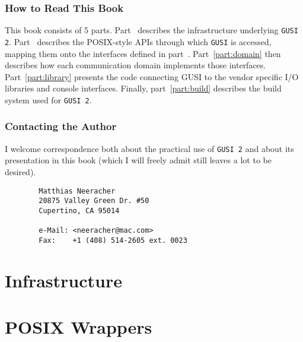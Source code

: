 \documentclass[a4paper,dvips]{book}
\newcommand{\clearemptydoublepage}{\newpage{\pagestyle{empty}\cleardoublepage}}
\begin{document}
\section{How to Read This Book}

This book consists of 5 parts. Part~\ref{part:infra} describes the infrastructure underlying \texttt{GUSI 2}.
Part~\ref{part:POSIX} describes the POSIX-style APIs through which \texttt{GUSI} is accessed, mapping them
onto the interfaces defined in part~\ref{part:infra}. Part~\ref{part:domain} then describes how each communication
domain implements those interfaces. Part~\ref{part:library} presents the code connecting GUSI to the 
vendor specific I/O libraries and console interfaces. Finally, part~\ref{part:build} describes the build
system used for \texttt{GUSI 2}.

\section{Contacting the Author}

I welcome correspondence both about the practical use of \texttt{GUSI 2} and about its presentation in this
book (which I will freely admit still leaves a lot to be desired).

\begin{verbatim}
        Matthias Neeracher 			
        20875 Valley Green Dr. #50			
        Cupertino, CA 95014
	
        e-Mail: <neeracher@mac.com>	
        Fax:   	+1 (408) 514-2605 ext. 0023
\end{verbatim}

%
%
\part{Infrastructure}
\label{part:infra}













\clearemptydoublepage
\part{POSIX Wrappers}
\label{part:POSIX}




\end{document}
